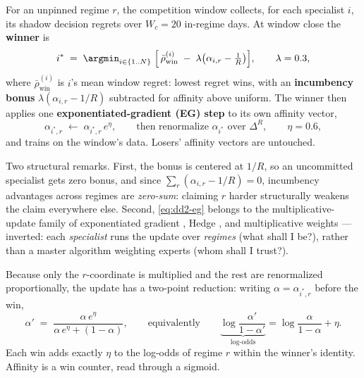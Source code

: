 \begin{definition}
\label{def:dd2-window}
For an unpinned regime $r$, the competition window collects, for each
specialist $i$, its shadow decision regrets over $W_c = 20$ in-regime days.
At window close the \textbf{winner} is
\begin{equation}
\label{eq:dd2-winner}
i^{*} \;=\; \argmin_{i \in \{1..N\}} \;
\Bigl[\, \bar\rho^{(i)}_{\mathrm{win}}
\;-\; \lambda \bigl(\alpha_{i,r} - \tfrac{1}{R}\bigr) \Bigr],
\qquad \lambda = 0.3,
\end{equation}
where $\bar\rho^{(i)}_{\mathrm{win}}$ is $i$'s mean window regret: lowest
regret wins, with an \textbf{incumbency bonus} $\lambda(\alpha_{i,r} - 1/R)$
subtracted for affinity above uniform. The winner then applies one
\textbf{exponentiated-gradient (EG) step} to its own affinity vector,
\begin{equation}
\label{eq:dd2-eg}
\alpha_{i^{*}, r} \;\leftarrow\; \alpha_{i^{*}, r}\, e^{\eta},
\qquad \text{then renormalize } \alpha_{i^{*}} \text{ over } \Delta^{R},
\qquad \eta = 0.6,
\end{equation}
and trains on the window's data. Losers' affinity vectors are untouched.
\end{definition}

Two structural remarks. First, the bonus is centered at $1/R$, so an
uncommitted specialist gets zero bonus, and since
$\sum_r (\alpha_{i,r} - 1/R) = 0$, incumbency advantages across regimes are
\emph{zero-sum}: claiming $r$ harder structurally weakens the claim
everywhere else. Second, \eqref{eq:dd2-eg} belongs to the
multiplicative-update family of exponentiated gradient
\citep{kivinen1997exponentiated}, Hedge \citep{freund1997decision}, and
multiplicative weights \citep{arora2012multiplicative}---inverted: each
\emph{specialist} runs the update over \emph{regimes} (what shall I be?),
rather than a master algorithm weighting experts (whom shall I trust?).

Because only the $r$-coordinate is multiplied and the rest are renormalized
proportionally, the update has a two-point reduction: writing
$\alpha = \alpha_{i^{*}, r}$ before the win,
\begin{equation}
\label{eq:dd2-egclosed}
\alpha' \;=\; \frac{\alpha\, e^{\eta}}{\alpha\, e^{\eta} + (1 - \alpha)},
\qquad \text{equivalently} \qquad
\underbrace{\log \frac{\alpha'}{1 - \alpha'}}_{\text{log-odds}}
= \log \frac{\alpha}{1 - \alpha} + \eta .
\end{equation}
Each win adds exactly $\eta$ to the log-odds of regime $r$ within the
winner's identity. Affinity is a win counter, read through a sigmoid.

